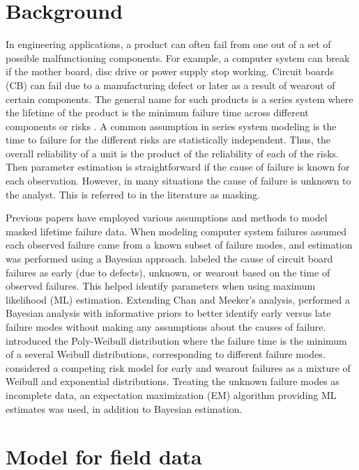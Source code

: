 \documentclass[12pt]{article}
\begin{document}
\section{Background}
\label{sec:Background}
In engineering applications, a product can often fail from one out of a set of possible malfunctioning components.  For example, a computer system can break if the mother board, disc drive or power supply stop working.  Circuit boards (CB) can fail due to a manufacturing defect or later as a result of wearout of certain components.  The general name for such products is a series system where the lifetime of the product is the minimum failure time across different components or risks \citep[Chapter 5]{nelson}.  A common assumption in series system modeling is the time to failure for the different risks are statistically independent.  Thus, the overall reliability of a unit is the product of the reliability of each of the risks.  Then parameter estimation is straightforward if the cause of failure is known for each observation.  However, in many situations the cause of failure is unknown to the analyst. This is referred to in the literature as masking.

Previous papers have employed various assumptions and methods to model masked lifetime failure data.  When modeling computer system failures \citet{reiser} assumed each observed failure came from a known subset of failure modes, and estimation was performed using a Bayesian approach.  \cite{chan} labeled the cause of circuit board failures as early (due to defects), unknown, or wearout based on the time of observed failures.  This helped identify parameters when using maximum likelihood (ML) estimation.  Extending Chan and Meeker's analysis, \citet{basu} performed a Bayesian analysis with informative priors to better identify early versus late failure modes without making any assumptions about the causes of failure.  \cite{berger} introduced the Poly-Weibull distribution where the failure time is the minimum of a several Weibull distributions, corresponding to different failure modes.  \cite{ranjan} considered a competing risk model for early and wearout failures as a mixture of Weibull and exponential distributions.  Treating the unknown failure modes as incomplete data, an expectation maximization (EM) algorithm providing ML estimates was used, in addition to Bayesian estimation.


\section{Model for field data}
\label{sec:GLFP model}
\end{document}
